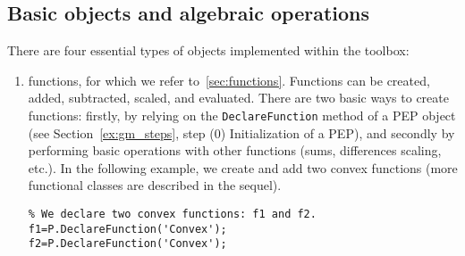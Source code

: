 \documentclass[11pt,a4paper]{article}
\begin{document}
	\subsection{Basic objects and algebraic operations}\label{sec:basicobjects}
	There are four essential types of objects implemented within the toolbox:
	\begin{enumerate}
		\item functions, for which we refer to~\ref{sec:functions}. Functions can be created, added, subtracted, scaled, and evaluated. There are two basic ways to create functions: firstly, by relying on the \verb?DeclareFunction? method of a PEP object (see Section~\ref{ex:gm_steps}, step (0) Initialization of a PEP), and secondly by performing basic operations with other functions (sums, differences scaling, etc.). In the following example, we create and add two convex functions (more functional classes are described in the sequel).\\[-1cm]
		\begin{lstlisting}
% We declare two convex functions: f1 and f2.
f1=P.DeclareFunction('Convex');
f2=P.DeclareFunction('Convex');


\end{lstlisting}
\end{enumerate}
\end{document}
